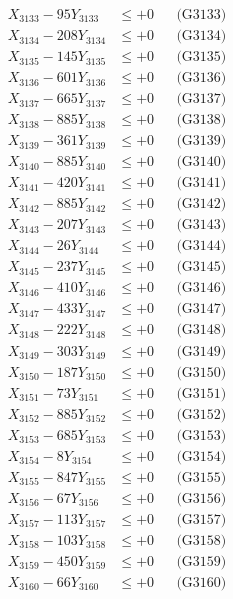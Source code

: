 \documentclass[a4paper,10pt]{article}
\begin{document}
{\begin{align}
X_{3133} - 95Y_{3133} &\leq +0 && \text{(G3133)} \\
X_{3134} - 208Y_{3134} &\leq +0 && \text{(G3134)} \\
X_{3135} - 145Y_{3135} &\leq +0 && \text{(G3135)} \\
X_{3136} - 601Y_{3136} &\leq +0 && \text{(G3136)} \\
X_{3137} - 665Y_{3137} &\leq +0 && \text{(G3137)} \\
X_{3138} - 885Y_{3138} &\leq +0 && \text{(G3138)} \\
X_{3139} - 361Y_{3139} &\leq +0 && \text{(G3139)} \\
X_{3140} - 885Y_{3140} &\leq +0 && \text{(G3140)} \\
\allowbreak
X_{3141} - 420Y_{3141} &\leq +0 && \text{(G3141)} \\
X_{3142} - 885Y_{3142} &\leq +0 && \text{(G3142)} \\
X_{3143} - 207Y_{3143} &\leq +0 && \text{(G3143)} \\
X_{3144} - 26Y_{3144} &\leq +0 && \text{(G3144)} \\
X_{3145} - 237Y_{3145} &\leq +0 && \text{(G3145)} \\
X_{3146} - 410Y_{3146} &\leq +0 && \text{(G3146)} \\
X_{3147} - 433Y_{3147} &\leq +0 && \text{(G3147)} \\
X_{3148} - 222Y_{3148} &\leq +0 && \text{(G3148)} \\
X_{3149} - 303Y_{3149} &\leq +0 && \text{(G3149)} \\
X_{3150} - 187Y_{3150} &\leq +0 && \text{(G3150)} \\
\allowbreak
X_{3151} - 73Y_{3151} &\leq +0 && \text{(G3151)} \\
X_{3152} - 885Y_{3152} &\leq +0 && \text{(G3152)} \\
X_{3153} - 685Y_{3153} &\leq +0 && \text{(G3153)} \\
X_{3154} - 8Y_{3154} &\leq +0 && \text{(G3154)} \\
X_{3155} - 847Y_{3155} &\leq +0 && \text{(G3155)} \\
X_{3156} - 67Y_{3156} &\leq +0 && \text{(G3156)} \\
X_{3157} - 113Y_{3157} &\leq +0 && \text{(G3157)} \\
X_{3158} - 103Y_{3158} &\leq +0 && \text{(G3158)} \\
X_{3159} - 450Y_{3159} &\leq +0 && \text{(G3159)} \\
X_{3160} - 66Y_{3160} &\leq +0 && \text{(G3160)} \\

\end{align}}
\end{document}
